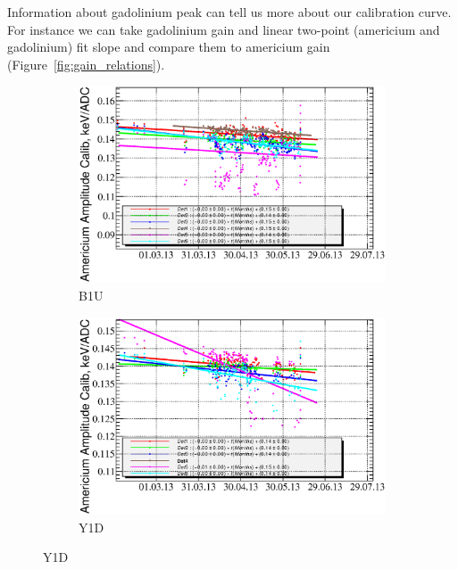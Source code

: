 \documentclass[a4paper,12pt]{article}
\newcommand\americium{${}^{241}$Am}
\begin{document}
Information about gadolinium peak can tell us more about our calibration curve.
For instance we can take gadolinium gain and linear two-point (americium and
gadolinium) fit slope and compare them to americium gain
(Figure~\ref{fig:gain_relations}).


\newcommand\amgainlabel{Timeline of the detector gain as measured with
$\alpha$-particles emitted by the \americium{} source. Colors represent individual
detectors.}
\begin{figure}[p]
%
\begin{subfigure}[t]{0.49\textwidth}
\includegraphics[width=\textwidth]{gfx/run13_alpha_study/B1U/c_chAmGain_by_day_B1U.eps}
\caption{B1U}
\end{subfigure}
%
\hfill
%
\begin{subfigure}[t]{0.49\textwidth}
\includegraphics[width=\textwidth]{gfx/run13_alpha_study/Y1D/c_chAmGain_by_day_Y1D.eps}
\caption{Y1D}
\end{subfigure}

\end{figure}
\end{document}
